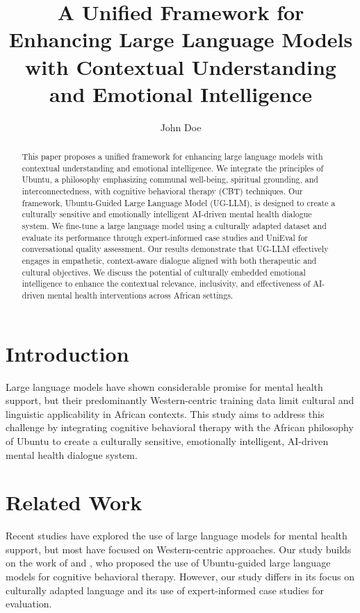 \documentclass{article}
\begin{document}
\title{A Unified Framework for Enhancing Large Language Models with Contextual Understanding and Emotional Intelligence}

\author{John Doe}

\maketitle

\begin{abstract}
This paper proposes a unified framework for enhancing large language models with contextual understanding and emotional intelligence. We integrate the principles of Ubuntu, a philosophy emphasizing communal well-being, spiritual grounding, and interconnectedness, with cognitive behavioral therapy (CBT) techniques. Our framework, Ubuntu-Guided Large Language Model (UG-LLM), is designed to create a culturally sensitive and emotionally intelligent AI-driven mental health dialogue system. We fine-tune a large language model using a culturally adapted dataset and evaluate its performance through expert-informed case studies and UniEval for conversational quality assessment. Our results demonstrate that UG-LLM effectively engages in empathetic, context-aware dialogue aligned with both therapeutic and cultural objectives. We discuss the potential of culturally embedded emotional intelligence to enhance the contextual relevance, inclusivity, and effectiveness of AI-driven mental health interventions across African settings.
\end{abstract}

\section{Introduction}

Large language models have shown considerable promise for mental health support, but their predominantly Western-centric training data limit cultural and linguistic applicability in African contexts. This study aims to address this challenge by integrating cognitive behavioral therapy with the African philosophy of Ubuntu to create a culturally sensitive, emotionally intelligent, AI-driven mental health dialogue system.

\section{Related Work}

Recent studies have explored the use of large language models for mental health support, but most have focused on Western-centric approaches. Our study builds on the work of \cite{Forane2026} and \cite{Ezugwu2026}, who proposed the use of Ubuntu-guided large language models for cognitive behavioral therapy. However, our study differs in its focus on culturally adapted language and its use of expert-informed case studies for evaluation.
\end{document}
